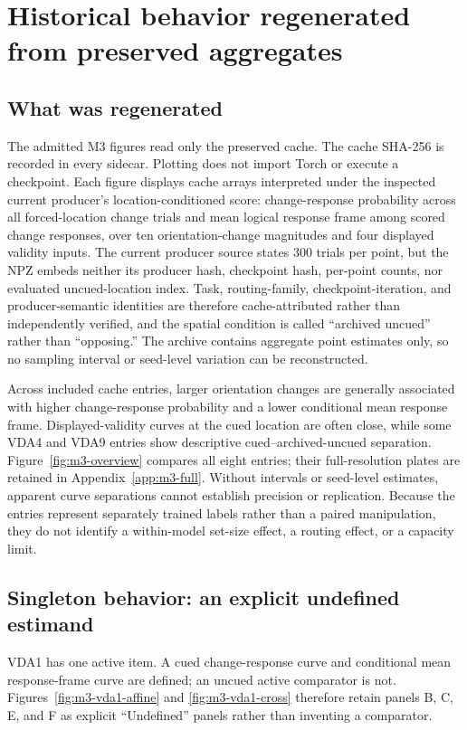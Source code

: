 \documentclass[11pt,a4paper]{article}
\begin{document}
\section{Historical behavior regenerated from preserved aggregates}
\subsection{What was regenerated}
The admitted M3 figures read only the preserved  cache. The cache SHA-256 is recorded in every sidecar. Plotting does not import Torch or execute a checkpoint. Each figure displays cache arrays interpreted under the inspected current producer's location-conditioned score: change-response probability across all forced-location change trials and mean logical response frame among scored change responses, over ten orientation-change magnitudes and four displayed validity inputs. The current producer source states 300 trials per point, but the NPZ embeds neither its producer hash, checkpoint hash, per-point counts, nor evaluated uncued-location index. Task, routing-family, checkpoint-iteration, and producer-semantic identities are therefore cache-attributed rather than independently verified, and the spatial condition is called ``archived uncued'' rather than ``opposing.'' The archive contains aggregate point estimates only, so no sampling interval or seed-level variation can be reconstructed.

Across included cache entries, larger orientation changes are generally associated with higher change-response probability and a lower conditional mean response frame. Displayed-validity curves at the cued location are often close, while some VDA4 and VDA9 entries show descriptive cued--archived-uncued separation. Figure~\ref{fig:m3-overview} compares all eight entries; their full-resolution plates are retained in Appendix~\ref{app:m3-full}. Without intervals or seed-level estimates, apparent curve separations cannot establish precision or replication. Because the entries represent separately trained labels rather than a paired manipulation, they do not identify a within-model set-size effect, a routing effect, or a capacity limit.

\subsection{Singleton behavior: an explicit undefined estimand}
VDA1 has one active item. A cued change-response curve and conditional mean response-frame curve are defined; an uncued active comparator is not. Figures~\ref{fig:m3-vda1-affine} and \ref{fig:m3-vda1-cross} therefore retain panels B, C, E, and F as explicit ``Undefined'' panels rather than inventing a comparator.
\end{document}
